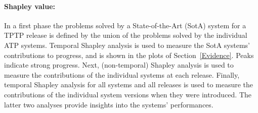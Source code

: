 \documentclass[runningheads]{llncs}
\begin{document}
\vspace*{-0.5em}
\paragraph{Shapley value:}
In a first phase the problems solved by a State-of-the-Art (SotA) system for a TPTP release is
defined by the union of the problems solved by the individual ATP systems. 
Temporal Shapley analysis \cite{KF+19} is used to measure the SotA systems' contributions to 
progress, and is shown in the plots of Section~\ref{Evidence}.
Peaks indicate strong progress.
Next, (non-temporal) Shapley analysis \cite{FK+16} is used to measure the contributions of the
individual systems at each release.
Finally, temporal Shapley analysis for all systems and all releases is used to measure the
contributions of the individual system versions when they were introduced.
The latter two analyses provide insights into the systems' performances.
\end{document}
